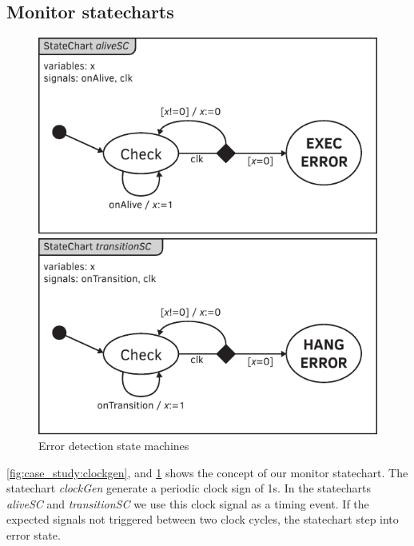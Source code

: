 \subsection{Monitor statecharts}
\label{sec:case_study:mon_sc}

\begin{figure}[h]
	\centering
	\begin{minipage}{0.49\linewidth}
		\includegraphics[width=0.9\linewidth]{include/figures/chapter_6/statecharts/onalive}
	\end{minipage}
	\begin{minipage}{0.49\linewidth}
		\includegraphics[width=0.9\linewidth]{include/figures/chapter_6/statecharts/ontransition}
	\end{minipage}
	\caption{Error detection state machines}
	\label{fig:case_study:errors}
\end{figure}

\cref{fig:case_study:clockgen}, and \cref{fig:case_study:errors} shows the concept of our monitor statechart. The statechart \emph{clockGen} generate a periodic clock sign of 1\si{\second}. In the statecharts \emph{aliveSC} and \emph{transitionSC} we use this clock signal as a timing event. If the expected signals not triggered between two clock cycles, the statechart step into error state.

